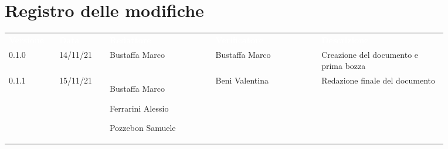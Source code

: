 \section*{Registro delle modifiche}

{\renewcommand{\arraystretch}{1.5}
\begin{tabular}{p{0.10\linewidth}p{0.10\linewidth}p{0.21\linewidth}p{0.21\linewidth}p{0.25\linewidth}}
	\rowcolor[RGB]{33, 73, 50}
	\textcolor{white}{\textbf{Versione}} & \textcolor{white}{\textbf{Data}} & \textcolor{white}
	{\textbf{Redattore}} & \textcolor{white}{\textbf{Verificatore}} & \textcolor{white}
	{\textbf{Descrizione}}\\
	\rowcolor[RGB]{216, 235, 171}
	0.1.0 & 14/11/21 & Bustaffa Marco & Bustaffa Marco & Creazione del documento e prima bozza\\
	\rowcolor[RGB]{233, 245, 206}
	0.1.1 & 15/11/21 & Bustaffa Marco \par  Ferrarini Alessio  \par Pozzebon Samuele & Beni Valentina & Redazione finale del documento\\
\end{tabular}	
}